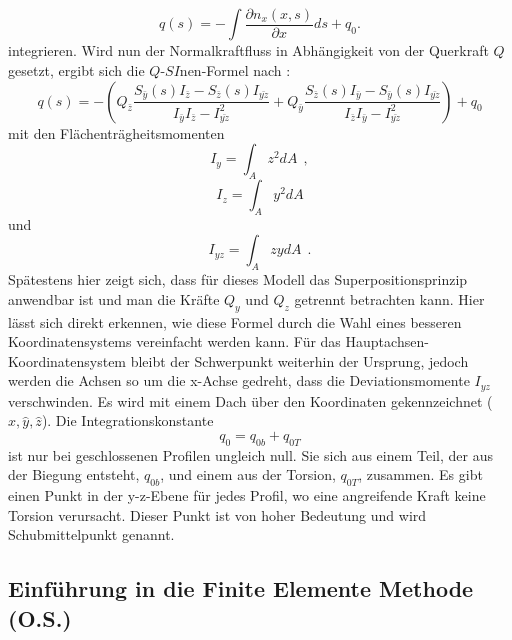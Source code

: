 \begin{equation}
	q(s)=-\int\frac{\partial n_x(x,s)}{\partial x}ds+q_0.
\end{equation}
integrieren. Wird nun der Normalkraftfluss in Abhängigkeit von der Querkraft $Q$ gesetzt, ergibt sich die $Q$-$SI$nen-Formel nach \cite{item15}:
\begin{equation}\label{qs}
	q(s)=-(Q_{\bar{z}}\frac{S_{\bar{y}}(s)I_{\bar{z}}-S_{\bar{z}}(s)I_{\bar{yz}}}{I_{\bar{y}}I_{\bar{z}}-I_{\bar{yz}}^2}+Q_{\bar{y}}\frac{S_{\bar{z}}(s)I_{\bar{y}}-S_{\bar{y}}(s)I_{\bar{yz}}}{I_{\bar{z}}I_{\bar{y}}-I_{\bar{yz}}^2})+q_0
\end{equation}
mit den Flächenträgheitsmomenten
\begin{equation}\label{FT1}
	I_{y} = \int_{A}^{}z^2dA ~\ ,
\end{equation}
\begin{equation}
	I_{z} = \int_{A}^{}y^2dA
\end{equation}
und
\begin{equation}\label{FT3}
	I_{yz} = \int_{A}^{}zydA  ~\ .
\end{equation} 
Spätestens hier zeigt sich, dass für dieses Modell das Superpositionsprinzip anwendbar ist und man die Kräfte $Q_y$ und $Q_z$ getrennt betrachten kann.
Hier lässt sich direkt erkennen, wie diese Formel durch die Wahl eines besseren Koordinatensystems vereinfacht werden kann. Für das Hauptachsen-Koordinatensystem bleibt der Schwerpunkt weiterhin der Ursprung, jedoch werden die Achsen so um die x-Achse gedreht, dass die Deviationsmomente $I_{yz}$ verschwinden. Es wird mit einem Dach über den Koordinaten gekennzeichnet ($\hat{x},\hat{y},\hat{z}$). Die Integrationskonstante
\begin{equation}
	q_{0} = q_{0b}+q_{0T}
\end{equation}
ist nur bei geschlossenen Profilen ungleich null. Sie sich aus einem Teil, der aus der Biegung entsteht, $q_{0b}$, und einem aus der Torsion, $q_{0T}$, zusammen. Es gibt einen Punkt in der y-z-Ebene für jedes Profil, wo eine angreifende Kraft keine Torsion verursacht. Dieser Punkt ist von hoher Bedeutung und wird Schubmittelpunkt genannt.
\newpage
\subsection{Einführung in die Finite Elemente Methode (O.S.)}\label{FEM-Theorie}
